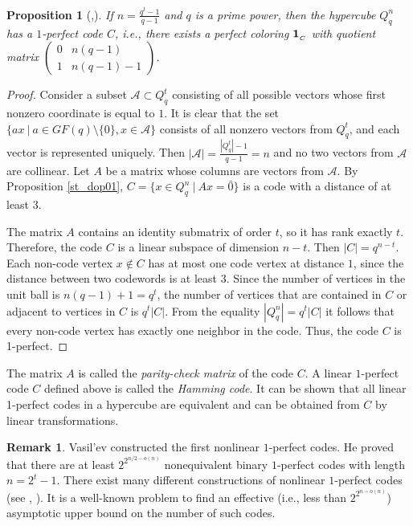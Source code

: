 \documentclass[11pt]{article}
\newtheorem{claim}{Proposition}[section]
\theoremstyle{definition}
\newtheorem{remark}{Remark}[section]
\begin{document}
\begin{claim}[\cite{Golay},\cite{Hamming50}]\label{c:codeHam}
If $n=\frac{q^t-1}{q-1}$ and $q$ is a prime power, then the
hypercube $Q^n_q$ has a $1$-perfect code $C$, i.e., there exists a
perfect coloring ${\bf 1}_{_C}$ with quotient matrix
$\begin{pmatrix}
0 & n(q-1) \\
1 & n(q-1)-1
\end{pmatrix}$.
\end{claim}
\begin{proof}
Consider a subset $\mathcal{A}\subset Q^t_q$ consisting of
all possible vectors whose first nonzero coordinate is equal to
$1$. It is clear that the set $\{ax \ |\ a\in GF(q)\setminus \{0\},
x\in \mathcal{A}\}$ consists of all nonzero vectors from $Q^t_q$,
and each vector is represented  uniquely. Then
$|\mathcal{A}|=\frac{|Q_q^t|-1}{q-1}=n$ and no two
vectors from $\mathcal{A}$ are collinear. Let $A$ be a matrix whose columns are
vectors from $\mathcal{A}$. By  Proposition
\ref{st_dop01},   $C=\{x\in Q^n_q \ |\
Ax=\bar{0}\}$ is a code with a distance of at least $3$. 

The matrix
$A$ contains an identity submatrix of order $t$, so it has rank exactly $t$. Therefore, the code $C$ is a linear
subspace of dimension $n-t$. Then $|C|=q^{n-t}$. Each
non-code vertex $x\not \in C$ has at most one code vertex at distance $1$,
since the distance between two codewords is at least $3$.
Since the number of vertices in the unit ball is $n(q-1)+1=q^t$, the number
of  vertices that are contained in $C$ or adjacent to vertices in
$C$ is $q^t|C|$. From the equality $|Q_q^n|=q^t|C|$ it follows that
every non-code vertex has exactly one neighbor in the code. Thus, the code
$C$ is 1-perfect. \end{proof}

The matrix $A$ is called the {\sl parity-check matrix} of the code $C$. A linear
$1$-perfect code $C$ defined above is called the {\sl Hamming code}. It can be shown that
all linear 1-perfect codes in a hypercube are equivalent and
can be obtained from $C$
by  linear transformations.

\begin{remark}
Vasil'ev \cite{Vas62} constructed the first nonlinear $1$-perfect codes. He proved that there are  at least  $2^{2^{n/2 -o(n)}}$ nonequivalent binary $1$-perfect codes with length $n=2^t-1$.  There exist many different constructions of  nonlinear $1$-perfect codes (see  \cite{Sol}, \cite{Etzion}).  It is a well-known problem to find an effective (i.e., less than  $2^{2^{n -o(n)}}$) asymptotic upper bound on the number of such codes. \label{Vasprob}
\end{remark}
\end{document}
